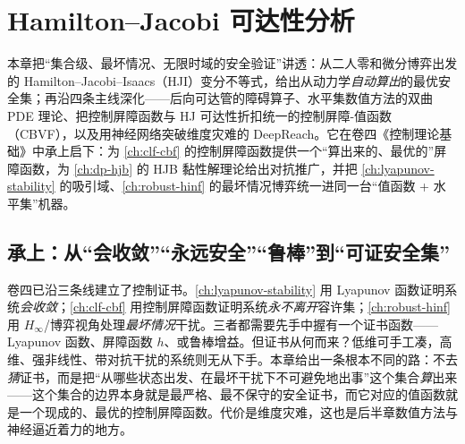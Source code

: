 \chapter{Hamilton--Jacobi 可达性分析}
\label{ch:hj-reachability}


\noindent
本章把“集合级、最坏情况、无限时域的安全验证”讲透：从二人零和微分博弈出发的 Hamilton--Jacobi--Isaacs（HJI）变分不等式，给出从动力学\emph{自动算出}的最优安全集；再沿四条主线深化——后向可达管的障碍算子、水平集数值方法的双曲 PDE 理论、把控制屏障函数与 HJ 可达性折扣统一的控制屏障-值函数（CBVF），以及用神经网络突破维度灾难的 DeepReach。它在卷四《控制理论基础》中承上启下：为 \cref{ch:clf-cbf} 的控制屏障函数提供一个“算出来的、最优的”屏障函数，为 \cref{ch:dp-hjb} 的 HJB 黏性解理论给出对抗推广，并把 \cref{ch:lyapunov-stability} 的吸引域、\cref{ch:robust-hinf} 的最坏情况博弈统一进同一台“值函数 + 水平集”机器。
\medskip

\section*{承上：从“会收敛”“永远安全”“鲁棒”到“可证安全集”}

卷四已沿三条线建立了控制证书。\cref{ch:lyapunov-stability} 用 Lyapunov 函数证明系统\emph{会收敛}；\cref{ch:clf-cbf} 用控制屏障函数证明系统\emph{永不离开}容许集；\cref{ch:robust-hinf} 用 $H_\infty$/博弈视角处理\emph{最坏情况}干扰。三者都需要先手中握有一个证书函数——Lyapunov 函数、屏障函数 $h$、或鲁棒增益。但证书从何而来？低维可手工凑，高维、强非线性、带对抗干扰的系统则无从下手。本章给出一条根本不同的路：不去\emph{猜}证书，而是把“从哪些状态出发、在最坏干扰下不可避免地出事”这个集合\emph{算}出来——这个集合的边界本身就是最严格、最不保守的安全证书，而它对应的值函数就是一个现成的、最优的控制屏障函数。代价是维度灾难，这也是后半章数值方法与神经逼近着力的地方。

